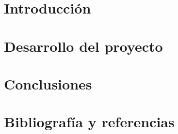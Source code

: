 \documentclass[12pt,a4paper]{book}
\begin{document}
\frontmatter











\mainmatter


\part{Introducción}



\part{Desarrollo del proyecto}





\part{Conclusiones}



\appendix


\backmatter
\part{Bibliografía y referencias}

\end{document}
